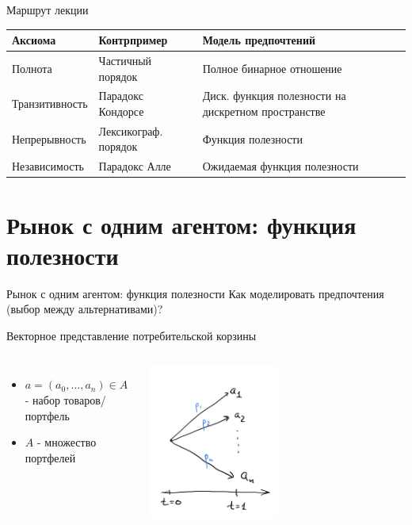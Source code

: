 \documentclass{beamer}
\begin{document}
\begin{frame}{Маршрут лекции}
    \begin{table}[]
\begin{tabular}{l|l|l}
Аксиома & Контрпример & Модель предпочтений                \\ \hline
Полнота      & Частичный порядок & Полное бинарное отношение     \\
Транзитивность   & Парадокс Кондорсе & Диск. функция полезности на дискретном пространстве                   \\
Непрерывность & Лексикограф. порядок & Функция полезности               \\
Независимость  & Парадокс Алле & Ожидаемая функция полезности
\end{tabular}
\end{table}
\end{frame}

\section{Рынок с одним агентом: функция полезности}

\begin{frame}{Рынок с одним агентом: функция полезности}
  \centering
\Large Как моделировать предпочтения (выбор между альтернативами)? 
\end{frame}


\begin{frame}{Векторное представление потребительской корзины}

\begin{columns}
    \begin{itemize}
        \item $a=(a_0,\ldots, a_n)\in A$ - набор товаров/портфель
        \item $A$ - множество портфелей
    \end{itemize}


\includegraphics[width=0.5\textwidth]{2_figs/oneperiod.jpeg}
\end{columns}

\end{frame}
\end{document}
